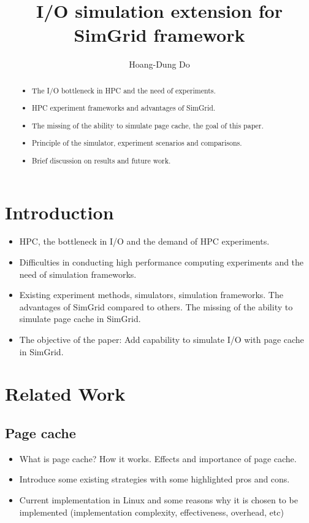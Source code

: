 \documentclass[conference]{IEEEtran}
\begin{document}
\title{I/O simulation extension for SimGrid framework}
\author{Hoang-Dung Do}
\maketitle

	\begin{abstract}
		\begin{itemize}
			\item The I/O bottleneck in HPC and the need of experiments.
			\item HPC experiment frameworks and advantages of SimGrid.
			\item The missing of the ability to simulate page cache, the goal of this paper.
			\item Principle of the simulator, experiment scenarios and comparisons.
			\item Brief discussion on results and future work.
		\end{itemize}
	\end{abstract}

	\section{Introduction}
		\begin{itemize}
			\item HPC, the bottleneck in I/O and the demand of HPC experiments. 
			\item Difficulties in conducting high performance computing experiments and the need of simulation frameworks.
			\item Existing experiment methods, simulators, simulation frameworks. The advantages of SimGrid compared to others. The missing of the ability to simulate page cache in SimGrid.
			\item The objective of the paper: Add capability to simulate I/O with page cache in SimGrid.
		\end{itemize}
	\section{Related Work}			
		
		\subsection{Page cache}
			\begin{itemize}
				\item What is page cache? How it works. Effects and importance of page cache.
				\item Introduce some existing strategies with some highlighted pros and cons.
				\item Current implementation in Linux and some reasons why it is chosen to be implemented (implementation complexity, effectiveness, overhead, etc)
			\end{itemize}									
\end{document}
